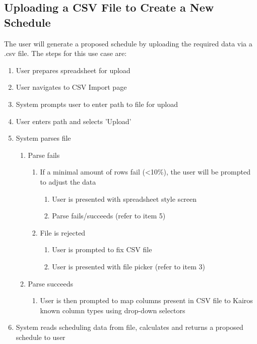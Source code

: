 \documentclass{extarticle}
\begin{document}
\subsection{Uploading a CSV File to Create a New Schedule}
The user will generate a proposed schedule by uploading the required data via a .csv file.  The steps for this use
case are:

\begin{enumerate}
\item User prepares spreadsheet for upload
\item User navigates to CSV Import page
\item System prompts user to enter path to file for upload
\item User enters path and selects 'Upload'

\item System parses file

    \begin{enumerate}
        \item Parse fails
        \begin{enumerate}
            \item If a minimal amount of rows fail (\textless 10\%), the user will be prompted to adjust the data
            \begin{enumerate}
                \item User is presented with spreadsheet style screen
                \item Parse fails/succeeds (refer to item 5)
            \end{enumerate}
            \item File is rejected
            \begin{enumerate}
                \item User is prompted to fix CSV file
                \item User is presented with file picker  (refer to item 3)
            \end{enumerate}
        \end{enumerate}
        \item Parse succeeds
        \begin{enumerate}
            \item User is then prompted to map columns present in CSV file to Kairos known column types using drop-down selectors
        \end{enumerate}
    \end{enumerate}
\item System reads scheduling data from file, calculates and returns a proposed schedule to user

\end{enumerate}
\end{document}
